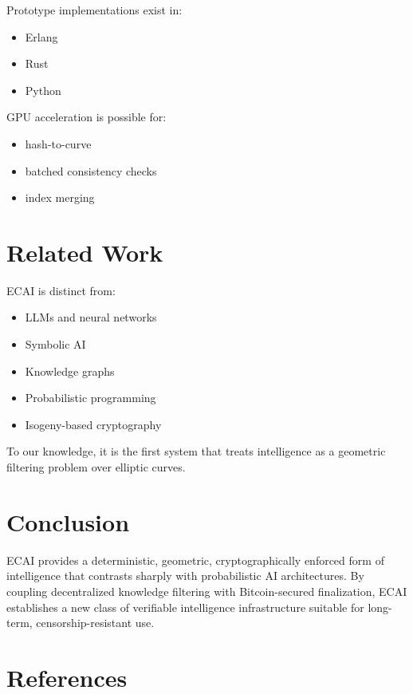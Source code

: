 \documentclass[11pt]{article}
\begin{document}
Prototype implementations exist in:
\begin{itemize}
\item Erlang
\item Rust
\item Python
\end{itemize}

GPU acceleration is possible for:
\begin{itemize}
\item hash-to-curve
\item batched consistency checks
\item index merging
\end{itemize}

\section{Related Work}

ECAI is distinct from:
\begin{itemize}[noitemsep]
    \item LLMs and neural networks
    \item Symbolic AI
    \item Knowledge graphs
    \item Probabilistic programming
    \item Isogeny-based cryptography
\end{itemize}

To our knowledge, it is the first system that treats intelligence as a geometric filtering problem over elliptic curves.

\section{Conclusion}

ECAI provides a deterministic, geometric, cryptographically enforced form of intelligence that contrasts sharply with probabilistic AI architectures. By coupling decentralized knowledge filtering with Bitcoin-secured finalization, ECAI establishes a new class of verifiable intelligence infrastructure suitable for long-term, censorship-resistant use.

\section{References}
\end{document}

